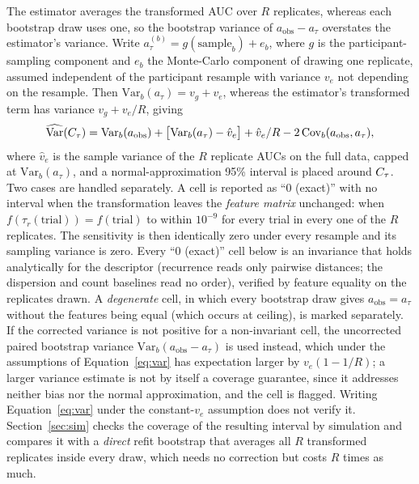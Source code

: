 The estimator averages the transformed AUC over $R$ replicates, whereas each bootstrap draw uses one, so the bootstrap variance of $a_{\mathrm{obs}} - a_\tau$ overstates the estimator's variance. Write $a_\tau^{(b)} = g(\text{sample}_b) + e_b$, where $g$ is the participant-sampling component and $e_b$ the Monte-Carlo component of drawing one replicate, assumed independent of the participant resample with variance $v_e$ not depending on the resample. Then $\mathrm{Var}_b(a_\tau) = v_g + v_e$, whereas the estimator's transformed term has variance $v_g + v_e/R$, giving
\begin{equation}
\widehat{\mathrm{Var}}(C_\tau) = \mathrm{Var}_b(a_{\mathrm{obs}}) + \big[\mathrm{Var}_b(a_{\tau}) - \hat v_e\big] + \hat v_e/R - 2\,\mathrm{Cov}_b(a_{\mathrm{obs}}, a_{\tau}),
\label{eq:var}
\end{equation}
where $\hat v_e$ is the sample variance of the $R$ replicate AUCs on the full data, capped at $\mathrm{Var}_b(a_\tau)$, and a normal-approximation 95\% interval is placed around $C_\tau$. Two cases are handled separately. A cell is reported as ``0 (exact)'' with no interval when the transformation leaves the \emph{feature matrix} unchanged: when $f(\tau_r(\text{trial})) = f(\text{trial})$ to within $10^{-9}$ for every trial in every one of the $R$ replicates. The sensitivity is then identically zero under every resample and its sampling variance is zero. Every ``0 (exact)'' cell below is an invariance that holds analytically for the descriptor (recurrence reads only pairwise distances; the dispersion and count baselines read no order), verified by feature equality on the replicates drawn. A \emph{degenerate} cell, in which every bootstrap draw gives $a_{\mathrm{obs}} = a_\tau$ without the features being equal (which occurs at ceiling), is marked separately. If the corrected variance is not positive for a non-invariant cell, the uncorrected paired bootstrap variance $\mathrm{Var}_b(a_{\mathrm{obs}} - a_\tau)$ is used instead, which under the assumptions of Equation~\ref{eq:var} has expectation larger by $v_e(1 - 1/R)$; a larger variance estimate is not by itself a coverage guarantee, since it addresses neither bias nor the normal approximation, and the cell is flagged. Writing Equation~\ref{eq:var} under the constant-$v_e$ assumption does not verify it. Section~\ref{sec:sim} checks the coverage of the resulting interval by simulation and compares it with a \emph{direct} refit bootstrap that averages all $R$ transformed replicates inside every draw, which needs no correction but costs $R$ times as much.

